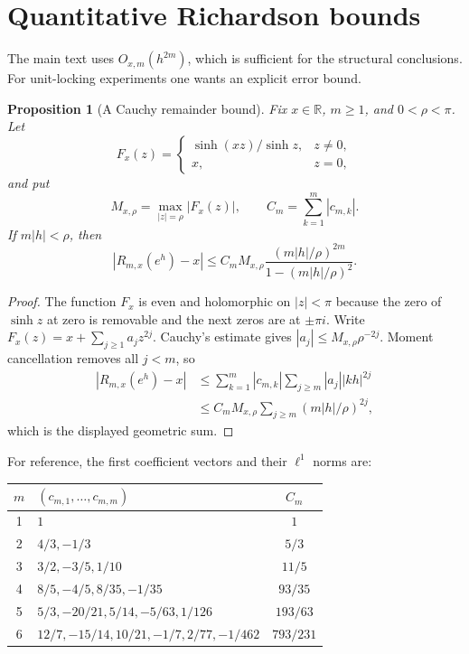 \documentclass[11pt,oneside]{article}
\newtheorem{proposition}[theorem]{Proposition}
\theoremstyle{definition}
\theoremstyle{remark}
\newcommand{\R}{\mathbb R}
\begin{document}
\appendix

\section{Quantitative Richardson bounds}
\label{app:remainder}

The main text uses $O_{x,m}(h^{2m})$, which is sufficient for the structural conclusions.  For
unit-locking experiments one wants an explicit error bound.

\begin{proposition}[A Cauchy remainder bound]
\label{prop:cauchyremainder}
Fix $x\in\R$, $m\ge1$, and $0<\rho<\pi$.  Let
\begin{equation}
 F_x(z)=\begin{cases}
 \sinh(xz)/\sinh z,&z\ne0,\\
 x,&z=0,
 \end{cases}
 \label{eq:Fx}
\end{equation}
and put
\begin{equation}
 M_{x,\rho}=\max_{|z|=\rho}|F_x(z)|,
 \qquad
 C_m=\sum_{k=1}^m|c_{m,k}|.
 \label{eq:MxrCm}
\end{equation}
If $m|h|<\rho$, then
\begin{equation}
 |R_{m,x}(e^h)-x|
 \le
 C_mM_{x,\rho}
 \frac{(m|h|/\rho)^{2m}}{1-(m|h|/\rho)^2}.
 \label{eq:explicitremainder}
\end{equation}
\end{proposition}

\begin{proof}
The function $F_x$ is even and holomorphic on $|z|<\pi$ because the zero of $\sinh z$ at zero
is removable and the next zeros are at $\pm\pi i$.  Write
$F_x(z)=x+\sum_{j\ge1}a_jz^{2j}$.  Cauchy's estimate gives
$|a_j|\le M_{x,\rho}\rho^{-2j}$.  Moment cancellation removes all $j<m$, so
\begin{align*}
 |R_{m,x}(e^h)-x|
 &\le\sum_{k=1}^m|c_{m,k}|\sum_{j\ge m}|a_j||kh|^{2j}\\
 &\le C_mM_{x,\rho}\sum_{j\ge m}(m|h|/\rho)^{2j},
\end{align*}
which is the displayed geometric sum.
\end{proof}

For reference, the first coefficient vectors and their $\ell^1$ norms are:
\begin{center}
\begin{tabular}{c>{\raggedright\arraybackslash}p{}c}
\toprule
$m$ & $(c_{m,1},\dots,c_{m,m})$ & $C_m$\\
\midrule
1 & $1$ & $1$\\
2 & $4/3,-1/3$ & $5/3$\\
3 & $3/2,-3/5,1/10$ & $11/5$\\
4 & $8/5,-4/5,8/35,-1/35$ & $93/35$\\
5 & $5/3,-20/21,5/14,-5/63,1/126$ & $193/63$\\
6 & $12/7,-15/14,10/21,-1/7,2/77,-1/462$ & $793/231$\\
\bottomrule
\end{tabular}
\end{center}
\end{document}
